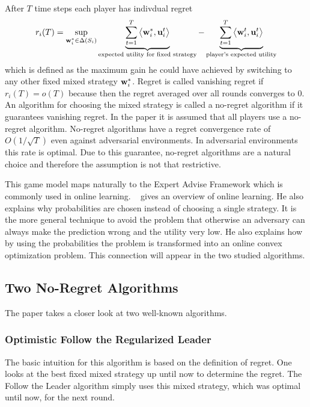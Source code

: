 \documentclass[a4paper]{article}
\theoremstyle{definition}
\renewcommand{\vec}[1]{\ensuremath{{\bf #1}}}
\newcommand{\dotp}[2]{\ensuremath{\left\langle #1, #2 \right\rangle}}
\begin{document}
After $T$ time steps each player has indivdual regret 
\begin{equation*}
r_i(T)
= \sup_{\vec{w}_i^*\in \Delta(S_i)} \underbrace{\sum_{t=1}^{T}
  \dotp{\vec{w}_i^*}{ \vec{u}_i^t}}_{\text{expected utility for fixed
    strategy}} -\underbrace{\sum_{t=1}^{T} \dotp{\vec{w}_i^t}{
    \vec{u}_i^t}}_{\text{player's expected utility}} 
\end{equation*}
which is defined as the maximum gain he could have achieved by
switching to any other fixed mixed strategy $\vec{w}_i^*$.
Regret is called vanishing regret if $r_i(T) = o(T)$ because then the regret averaged
over all rounds converges to 0.
An algorithm for choosing the mixed strategy is called a no-regret algorithm if it guarantees vanishing
regret.
In the paper it is assumed that all players use a no-regret algorithm.
No-regret algorithms have a regret convergence rate of $O(1/\sqrt{T})$
even against adversarial environments.
In adversarial environments this rate is optimal.
Due to this guarantee, no-regret algorithms are a natural choice and
therefore the assumption is not that restrictive.

This game model maps naturally to the Expert Advise Framework which is
commonly used in online learning.
\citeauthor[]{Foundations}~\cite{Foundations} gives an overview of online learning.
He also explains why probabilities are chosen instead of choosing a
single strategy.
It is the more general technique to avoid the problem that otherwise
an adversary can always make the prediction wrong and the utility very
low.
He also explains how by using the probabilities the problem is
transformed into an online convex optimization problem.
This connection will appear in the two studied algorithms.



\subsection{Two No-Regret Algorithms}
\label{sec:two-no-regret}

The paper takes a closer look at two well-known algorithms.

\subsubsection{Optimistic Follow the Regularized Leader}
\label{sec:optim-foll-regul}
The basic intuition for this algorithm is based on the definition of
regret.
One looks at the best fixed mixed strategy up until now to determine
the regret.
The Follow the Leader algorithm simply uses this mixed strategy, which was optimal until now, for
the next round.
\end{document}

